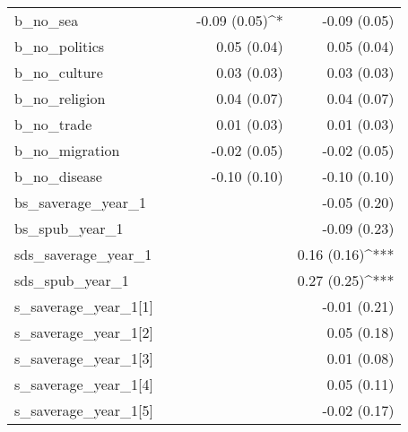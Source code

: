 \begin{center}
\begin{longtable}{l D{)}{)}{9)3} D{)}{)}{9)3} D{)}{)}{9)3} D{)}{)}{9)3}}
b\_no\_sea                  &                       &                       & -0.09 \; (0.05)^{*}   & -0.09 \; (0.05)       \\
b\_no\_politics             &                       &                       & 0.05 \; (0.04)        & 0.05 \; (0.04)        \\
b\_no\_culture              &                       &                       & 0.03 \; (0.03)        & 0.03 \; (0.03)        \\
b\_no\_religion             &                       &                       & 0.04 \; (0.07)        & 0.04 \; (0.07)        \\
b\_no\_trade                &                       &                       & 0.01 \; (0.03)        & 0.01 \; (0.03)        \\
b\_no\_migration            &                       &                       & -0.02 \; (0.05)       & -0.02 \; (0.05)       \\
b\_no\_disease              &                       &                       & -0.10 \; (0.10)       & -0.10 \; (0.10)       \\
bs\_saverage\_year\_1       &                       &                       &                       & -0.05 \; (0.20)       \\
bs\_spub\_year\_1           &                       &                       &                       & -0.09 \; (0.23)       \\
sds\_saverage\_year\_1      &                       &                       &                       & 0.16 \; (0.16)^{***}  \\
sds\_spub\_year\_1          &                       &                       &                       & 0.27 \; (0.25)^{***}  \\
s\_saverage\_year\_1[1]     &                       &                       &                       & -0.01 \; (0.21)       \\
s\_saverage\_year\_1[2]     &                       &                       &                       & 0.05 \; (0.18)        \\
s\_saverage\_year\_1[3]     &                       &                       &                       & 0.01 \; (0.08)        \\
s\_saverage\_year\_1[4]     &                       &                       &                       & 0.05 \; (0.11)        \\
s\_saverage\_year\_1[5]     &                       &                       &                       & -0.02 \; (0.17)       \\

\end{longtable}
\end{center}
